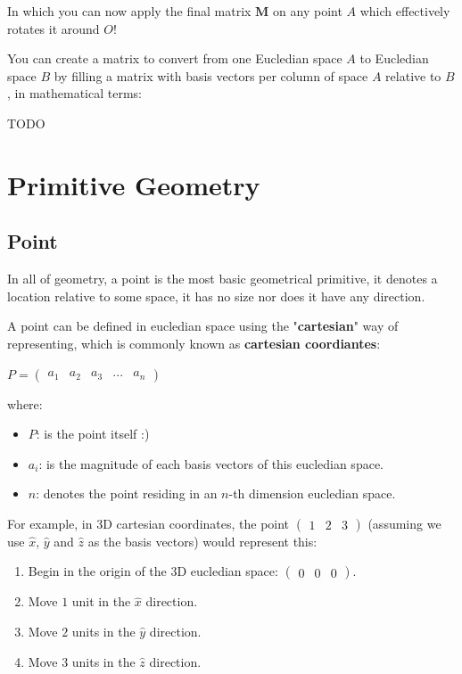In which you can now apply the final matrix $\textbf{M}$ on any point $A$ which effectively rotates it around $O$!

\sgap
You can create a matrix to convert from one Eucledian space $A$ to Eucledian space $B$ by filling a matrix with
basis vectors per column of space $A$ relative to $B$, in mathematical terms:

TODO




\section{Primitive Geometry}
\subsection{Point}
In all of geometry, a point is the most basic geometrical primitive, it denotes a location relative to some space, it has no size
nor does it have any direction.

A point can be defined in eucledian space using the "\textbf{cartesian}" way of representing, which is commonly known as
\textbf{cartesian coordiantes}:
\begin{center}
    $P = \begin{pmatrix}a_1 & a_2 & a_3 & ... & a_n\end{pmatrix}$
\end{center}

where:
\begin{itemize}
    \item $P$: is the point itself :)
    \item $a_i$: is the magnitude of each basis vectors of this eucledian space.
    \item $n$: denotes the point residing in an $n$-th dimension eucledian space.
\end{itemize}

For example, in 3D cartesian coordinates, the point $\begin{pmatrix}1 & 2 & 3\end{pmatrix}$ 
(assuming we use $\hat{x}$, $\hat{y}$ and $\hat{z}$ as the basis vectors) would represent this:
\begin{enumerate}
    \item Begin in the origin of the 3D eucledian space: $\begin{pmatrix}0 & 0 & 0\end{pmatrix}$.
    \item Move $1$ unit in the $\hat{x}$ direction.
    \item Move $2$ units in the $\hat{y}$ direction.
    \item Move $3$ units in the $\hat{z}$ direction.
\end{enumerate}


